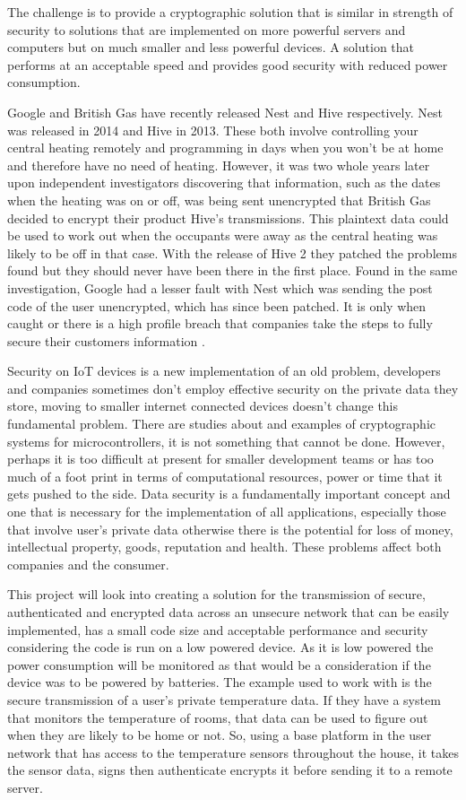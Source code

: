 	The challenge is to provide a cryptographic solution that is similar in strength of security to solutions that are implemented on more powerful servers and computers but on much smaller and less powerful devices. A solution that performs at an acceptable speed and provides good security with reduced power consumption.
	
	Google and British Gas have recently released Nest and Hive respectively. Nest was released in 2014 and Hive in 2013. These both involve controlling your central heating remotely and programming in days when you won't be at home and therefore have no need of heating. However, it was two whole years later upon independent investigators discovering that information, such as the dates when the heating was on or off, was being sent unencrypted that British Gas decided to encrypt their product Hive's transmissions. This plaintext data could be used to work out when the occupants were away as the central heating was likely to be off in that case. With the release of Hive 2 they patched the problems found but they should never have been there in the first place. Found in the same investigation, Google had a lesser fault with Nest which was sending the post code of the user unencrypted, which has since been patched. It is only when caught or there is a high profile breach that companies take the steps to fully secure their customers information \cite{which}. 
	
	Security on IoT devices is a new implementation of an old problem, developers and companies sometimes don't employ effective security on the private data they store, moving to smaller internet connected devices doesn't change this fundamental problem. There are studies about and examples of cryptographic systems for microcontrollers, it is not something that cannot be done. However, perhaps it is too difficult at present for smaller development teams or has too much of a foot print in terms of computational resources, power or time that it gets pushed to the side. Data security is a fundamentally important concept and one that is necessary for the implementation of all applications, especially those that involve user's private data otherwise there is the potential for loss of money, intellectual property, goods, reputation and health. These problems affect both companies and the consumer.
	
	This project will look into creating a solution for the transmission of secure, authenticated and encrypted data across an unsecure network that can be easily implemented, has a small code size and acceptable performance and security considering the code is run on a low powered device. As it is low powered the power consumption will be monitored as that would be a consideration if the device was to be powered by batteries. The example used to work with is the secure transmission of a user's private temperature data. If they have a system that monitors the temperature of rooms, that data can be used to figure out when they are likely to be home or not. So, using a base platform in the user network that has access to the temperature sensors throughout the house, it takes the sensor data, signs then authenticate encrypts it before sending it to a remote server. 
	
	
	
